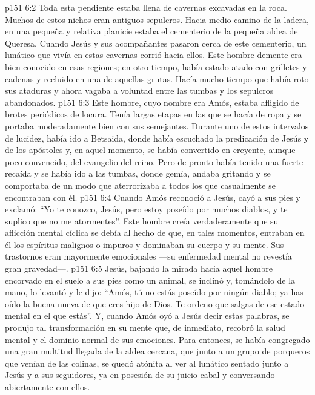 \vs p151 6:2 Toda esta pendiente estaba llena de cavernas excavadas en la roca. Muchos de estos nichos eran antiguos sepulcros. Hacia medio camino de la ladera, en una pequeña y relativa planicie estaba el cementerio de la pequeña aldea de Queresa. Cuando Jesús y sus acompañantes pasaron cerca de este cementerio, un lunático que vivía en estas cavernas corrió hacia ellos. Este hombre demente era bien conocido en esas regiones; en otro tiempo, había estado atado con grilletes y cadenas y recluido en una de aquellas grutas. Hacía mucho tiempo que había roto sus ataduras y ahora vagaba a voluntad entre las tumbas y los sepulcros abandonados.
\vs p151 6:3 Este hombre, cuyo nombre era Amós, estaba afligido de brotes periódicos de locura. Tenía largas etapas en las que se hacía de ropa y se portaba moderadamente bien con sus semejantes. Durante uno de estos intervalos de lucidez, había ido a Betsaida, donde había escuchado la predicación de Jesús y de los apóstoles y, en aquel momento, se había convertido en creyente, aunque poco convencido, del evangelio del reino. Pero de pronto había tenido una fuerte recaída y se había ido a las tumbas, donde gemía, andaba gritando y se comportaba de un modo que aterrorizaba a todos los que casualmente se encontraban con él.
\vs p151 6:4 Cuando Amós reconoció a Jesús, cayó a sus pies y exclamó: “Yo te conozco, Jesús, pero estoy poseído por muchos diablos, y te suplico que no me atormentes”. Este hombre creía verdaderamente que su aflicción mental cíclica se debía al hecho de que, en tales momentos, entraban en él los espíritus malignos o impuros y dominaban su cuerpo y su mente. Sus trastornos eran mayormente emocionales ---su enfermedad mental no revestía gran gravedad---.
\vs p151 6:5 Jesús, bajando la mirada hacia aquel hombre encorvado en el suelo a sus pies como un animal, se inclinó y, tomándolo de la mano, lo levantó y le dijo: “Amós, tú no estás poseído por ningún diablo; ya has oído la buena nueva de que eres hijo de Dios. Te ordeno que salgas de ese estado mental en el que estás”. Y, cuando Amós oyó a Jesús decir estas palabras, se produjo tal transformación en su mente que, de inmediato, recobró la salud mental y el dominio normal de sus emociones. Para entonces, se había congregado una gran multitud llegada de la aldea cercana, que junto a un grupo de porqueros que venían de las colinas, se quedó atónita al ver al lunático sentado junto a Jesús y a sus seguidores, ya en posesión de su juicio cabal y conversando abiertamente con ellos.
